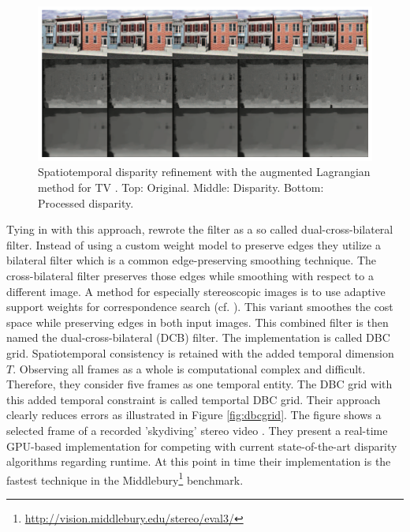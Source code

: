 \begin{figure}[h!]
  \centering
  \includegraphics[width=1.0\textwidth]{src/images/spatiotemporal.png}
  \caption[Spatiotemporal disparity refinement]{Spatiotemporal disparity refinement with the augmented Lagrangian method for TV \citep{khoshabeh2011spatio}. Top: Original. Middle: Disparity. Bottom: Processed disparity.}
  \label{fig:spatiotemporal}
\end{figure}

\noindent Tying in with this approach, \citeauthor{richardt2010real} \citep{richardt2010real} rewrote the filter as a so called dual-cross-bilateral filter.
Instead of using a custom weight model to preserve edges they utilize a bilateral filter which is a common edge-preserving smoothing technique.
The cross-bilateral filter preserves those edges while smoothing with respect to a different image.
A method for especially stereoscopic images is to use adaptive support weights for correspondence search (cf. \citep{yoon2006adaptive}).
This variant smoothes the cost space while preserving edges in both input images.
This combined filter is then named the dual-cross-bilateral (DCB) filter.
The implementation is called DBC grid.
Spatiotemporal consistency is retained with the added temporal dimension $T$.
Observing all frames as a whole is computational complex and difficult.
Therefore, they consider five frames as one temporal entity.
The DBC grid with this added temporal constraint is called temportal DBC grid.
Their approach clearly reduces errors as illustrated in Figure \ref{fig:dbcgrid}.
The figure shows a selected frame of a recorded 'skydiving' stereo video \citep{richardt2010real}.
\newline\newline\noindent They present a real-time GPU-based implementation for competing with current state-of-the-art disparity algorithms regarding runtime.
At this point in time their implementation is the fastest technique in the Middlebury\footnote{\url{http://vision.middlebury.edu/stereo/eval3/}} benchmark.

